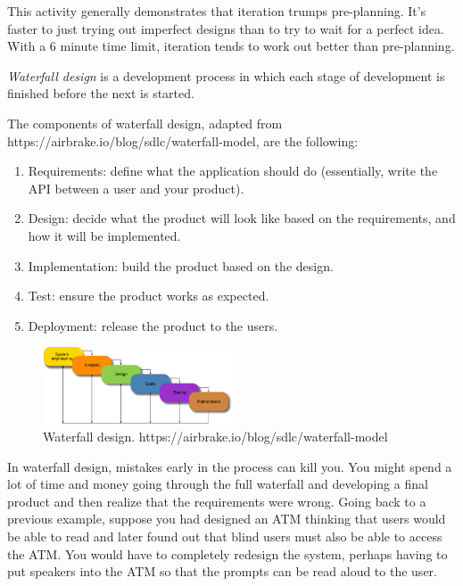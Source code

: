 This activity generally demonstrates that iteration trumps pre-planning. It's faster to just trying out imperfect designs than to try to wait for a perfect idea. With a 6 minute time limit, iteration tends to work out better than pre-planning. 

\begin{definition}
\emph{Waterfall design} is a development process in which each stage of development is finished before the next is started. 
\end{definition}

The components of waterfall design, adapted from https://airbrake.io/blog/sdlc/waterfall-model, are the following:
\begin{enumerate}
	\item Requirements: define what the application should do (essentially, write the API between a user and your product).
	\item Design: decide what the product will look like based on the requirements, and how it will be implemented.
	\item Implementation: build the product based on the design.
	\item Test: ensure the product works as expected.
	\item Deployment: release the product to the users.
\end{enumerate}

\begin{figure}
	\centering
	\includegraphics[width=0.5\textwidth]{images/waterfall.png}
	\caption{Waterfall design. https://airbrake.io/blog/sdlc/waterfall-model}
\end{figure}

In waterfall design, mistakes early in the process can kill you. You might spend a lot of time and money going through the full waterfall and developing a final product and then realize that the requirements were wrong. Going back to a previous example, suppose you had designed an ATM thinking that users would be able to read and later found out that blind users must also be able to access the ATM. You would have to completely redesign the system, perhaps having to put speakers into the ATM so that the prompts can be read aloud to the user. 

